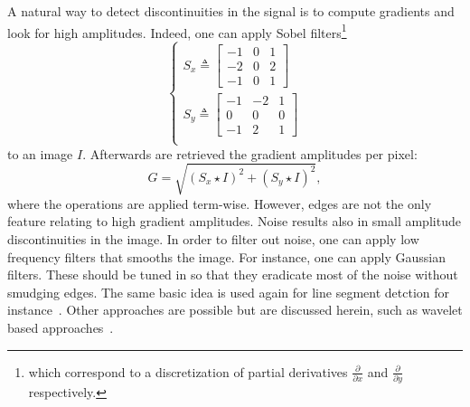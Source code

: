             A natural way to detect discontinuities in the signal is to compute gradients and look for high amplitudes.
            Indeed, one can apply Sobel filters\footnote{which correspond to a discretization of partial derivatives $\frac{\partial}{\partial x}$ and $\frac{\partial}{\partial y}$ respectively.}
            \begin{equation}
                \label{eq::sobel_filters}
                \begin{cases}
                    S_x \triangleq \begin{bmatrix}
                        -1 & 0 & 1\\
                        -2 & 0 & 2\\
                        -1 & 0 & 1
                    \end{bmatrix}\\
                    S_y \triangleq \begin{bmatrix}
                        -1 & -2 & 1\\
                        0 & 0 & 0\\
                        -1 & 2 & 1
                    \end{bmatrix}\\
                \end{cases}
            \end{equation}
            to an image $I$.
            Afterwards are retrieved the gradient amplitudes per pixel:
            \begin{equation}
                \label{eq::sobel_amplitude}
                G = \sqrt{\left(S_x\star I\right)^2 + \left(S_y\star I\right)^2},
            \end{equation}
            where the operations are applied term-wise.
            However, edges are not the only feature relating to high gradient amplitudes.
            Noise results also in small amplitude discontinuities in the image.
            In order to filter out noise, one can apply low frequency filters that smooths the image.
            For instance, one can apply Gaussian filters.
            These should be tuned in so that they eradicate most of the noise without smudging edges.
            The same basic idea is used again for line segment detction for instance~\parencite{von2008lsd}.
            Other approaches are possible but are discussed herein, such as wavelet based approaches~\parencite{mallat1992singularity}.

